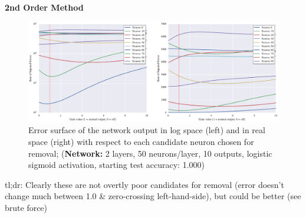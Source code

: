 \textbf{2nd Order Method}
\begin{figure}[!hb]
\centering
\includegraphics[width=\linewidth]{png/mnist-deep-g1-gain.pdf}
\caption{Error surface of the network output in log space (left) and in real space (right) with respect to each candidate neuron chosen for removal; (\textbf{Network:} 2 layers, 50 neurons/layer, 10 outputs, logistic sigmoid activation, starting test accuracy: 1.000)}
\label{fig:mnist-g2-double-layer}
\end{figure}
tl;dr: Clearly these are not overtly poor candidates for removal (error doesn't change much between 1.0 \& zero-crossing left-hand-side), but could be better (see brute force)
